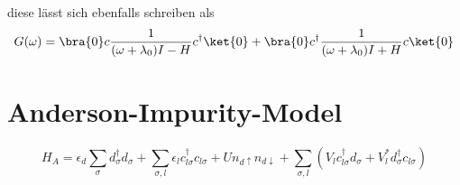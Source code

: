 diese lässt sich ebenfalls schreiben als
\begin{equation}\label{GreensFunctionDOS}
G(\omega) = \bra{0}c\frac{1}{(\omega + \lambda_0) I - H}c^\dagger\ket{0} + \bra{0}c^\dagger\frac{1}{(\omega + \lambda_0) I + H}c\ket{0}
\end{equation}\cite{Lu,Stover,Ulm}

\section{Anderson-Impurity-Model}
\begin{equation}\label{key}
H_{A} = \epsilon_d \sum_{\sigma} d_{\sigma}^\dag d_{\sigma} +\sum_{\sigma,l}\epsilon_l c_{l\sigma}^\dag c_{l\sigma} + Un_{d\uparrow}n_{d\downarrow} + \sum_{\sigma,l}\left( V_l c_{l\sigma}^\dag d_{\sigma} + V_l^* d_{\sigma}^\dag c_{l\sigma}\right) 
\end{equation}



